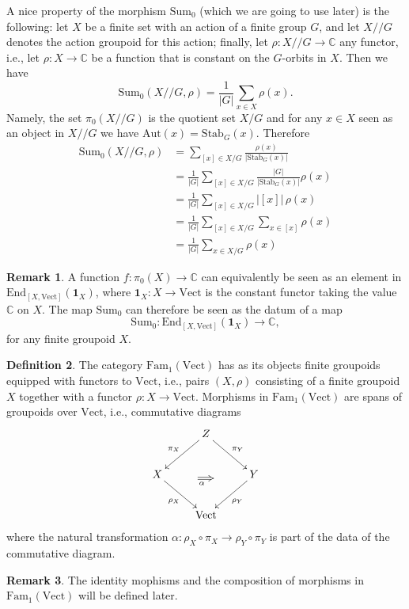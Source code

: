 \documentclass[12pt]{scrartcl}
\theoremstyle{definition}
\newtheorem{definition}{Definition}
\newtheorem{remark}[definition]{Remark}
\numberwithin{equation}{section}
\numberwithin{definition}{section}
\numberwithin{figure}{section}
\begin{document}
A nice property of the morphism $\mathrm{Sum}_0$ (which we are going to use later) is the following: let $X$ be a finite set with an action of a finite group $G$, and let $X/\!/G$ denotes the action groupoid for this action; finally, let $\rho\colon X/\!/G\to \mathbb{C}$ any functor, i.e., let $\rho\colon X\to \mathbb{C}$ be a function that is constant on the $G$-orbits in $X$. Then we have
\begin{equation}\label{sum-0-on-action-groupoids}
\mathrm{Sum}_0(X/\!/G,\rho)=\frac{1}{|G|}\sum_{x\in X} \rho(x).
\end{equation}
Namely, the set $\pi_0(X/\!/G)$ is the quotient set $X/G$ and for any $x\in X$ seen as an object in $X/\!/G$ we have $\mathrm{Aut}(x)=\mathrm{Stab}_G(x)$. Therefore
\begin{align*}
\mathrm{Sum}_0(X/\!/G,\rho)&=\sum_{[x]\in X/G}\frac{\rho(x)}{|\mathrm{Stab}_G(x)|}\\
&=\frac{1}{|G|}\sum_{[x]\in X/G}\frac{|G|}{|\mathrm{Stab}_G(x)|}\rho(x)\\
&=\frac{1}{|G|}\sum_{[x]\in X/G}|[x]|\,\rho(x)\\
&=\frac{1}{|G|}\sum_{[x]\in X/G}\sum_{x\in [x]}\rho(x)\\
&=\frac{1}{|G|}\sum_{x\in X/G}\rho(x)
\end{align*}
\begin{remark}
A function $f\colon \pi_0(X)\to \mathbb{C}$ can equivalently be seen as an element in $\mathrm{End}_{[X,\mathrm{Vect}]}(\mathbf{1}_X)$, where $\mathbf{1}_X\colon X\to \mathrm{Vect}$ is the constant functor taking the value $\mathbb{C}$ on $X$. The map $\mathrm{Sum}_0$ can therefore be seen as the datum of a map
\[
\mathrm{Sum}_0\colon \mathrm{End}_{[X,\mathrm{Vect}]}(\mathbf{1}_X) \to \mathbb{C},
\]
for any finite groupoid $X$.
\end{remark}

\begin{definition}
The category $\mathrm{Fam}_1(\mathrm{Vect})$ has as its objects finite groupoids equipped with functors to $\mathrm{Vect}$, i.e., pairs $(X,\rho)$ consisting of a finite groupoid $X$ together with a functor $\rho\colon X\to \mathrm{Vect}$. Morphisms in $\mathrm{Fam}_1(\mathrm{Vect})$ are spans of groupoids over $\mathrm{Vect}$, i.e., commutative diagrams
\[
\xymatrix{
&Z\ar[dl]_{\pi_X}\ar[dr]^{\pi_Y}&\\
X\ar[dr]_{\rho_X}&&Y\ar[dl]^{\rho_Y}\\
&\mathrm{Vect}
\ar@{=>}_{\alpha\phantom{m}}(13,-14);(18,-14)
}
\]
where the natural transformation $\alpha\colon \rho_X\circ \pi_X\to \rho_Y\circ \pi_Y$ is part of the data of the commutative diagram.
\end{definition}
\begin{remark}
The identity mophisms and the composition of morphisms in $\mathrm{Fam}_1(\mathrm{Vect})$ will be defined later.
\end{remark}
\end{document}
